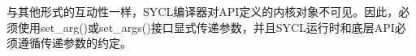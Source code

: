 与其他形式的互动性一样，SYCL编译器对API定义的内核对象不可见。因此，必须使用set\_arg()或set\_args()接口显式传递参数，并且SYCL运行时和底层API必须遵循传递参数的约定。\par









































